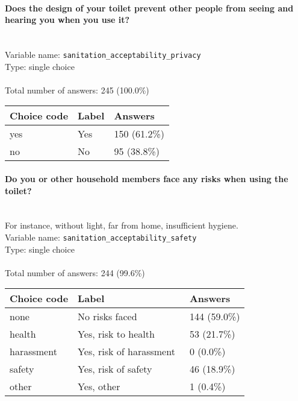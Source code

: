 \documentclass[11.5pt, a4paper]{scrartcl}
\begin{document}
\paragraph{Does the design of your toilet prevent other people from seeing and hearing you when you use it? }
\  \\Variable name: \texttt{sanitation\_acceptability\_privacy}\\
Type: single choice\\
\\Total number of answers: 245 (100.0\%)
\\[0.2em] \begin{tabular}{p{4cm}|p{8cm}|p{3cm}}
Choice code & Label & Answers \\
\hline
yes & Yes& \cellcolor{color3}150 (61.2\%)\\
\cellcolor{mygray} no & \cellcolor{mygray}No & \cellcolor{color1}95 (38.8\%)\\
\end{tabular}
\paragraph{Do you or other household members face any risks when using the toilet? }
\ \\ {\small For instance, without light, far from home, insufficient hygiene.}
\  \\Variable name: \texttt{sanitation\_acceptability\_safety}\\
Type: single choice\\
\\Total number of answers: 244 (99.6\%)
\\[0.2em] \begin{tabular}{p{4cm}|p{8cm}|p{3cm}}
Choice code & Label & Answers \\
\hline
none & No risks faced & \cellcolor{color2}144 (59.0\%)\\
\cellcolor{mygray} health & \cellcolor{mygray}Yes, risk to health  & \cellcolor{color1}53 (21.7\%)\\
harassment & Yes, risk of harassment & \cellcolor{color0}0 (0.0\%)\\
\cellcolor{mygray} safety & \cellcolor{mygray}Yes, risk of safety & \cellcolor{color0}46 (18.9\%)\\
other & Yes, other & \cellcolor{color0}1 (0.4\%)\\
\end{tabular}
\end{document}
